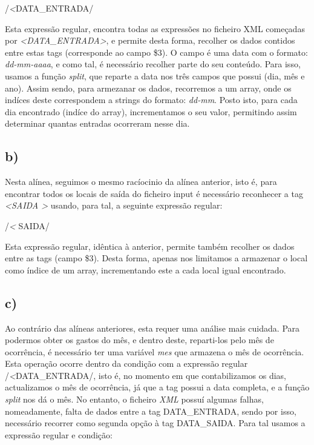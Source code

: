 \documentclass[12pt,a4paper]{report}
\begin{document}
\begin{center}
\vspace{0.3cm}
/\^\emph{\textless}DATA\_ENTRADA/ \par
\vspace{0.3cm}
\end{center}


\noindent Esta expressão regular, encontra todas as expressões no ficheiro XML começadas por \emph{\textless DATA\_ENTRADA\textgreater}, e permite desta forma, recolher os dados contidos entre estas tags (corresponde ao campo \$3). O campo é uma data com o formato: \emph{dd-mm-aaaa}, e como tal, é necessário recolher parte do seu conteúdo. Para isso, usamos a função \emph{split}, que reparte a data nos três campos que possui (dia, mês e ano).
Assim sendo, para armezanar os dados, recorremos a um array, onde os indíces deste correspondem a strings do formato: \emph{dd-mm}. Posto isto, para cada dia encontrado (indíce do array), incrementamos o seu valor, permitindo assim determinar quantas entradas ocorreram nesse dia. 

\subsection{b)}
Nesta alínea, seguimos o mesmo racíocinio da alínea anterior, isto é, para encontrar todos os locais de saída do ficheiro input é necessário reconhecer a tag \emph{\textless SAIDA \textgreater} usando, para tal, a seguinte expressão regular: \par 

\begin{center}
\vspace{0.3cm}
/\^\emph{\textless} SAIDA/ \par
\vspace{0.3cm}
\end{center}


\noindent Esta expressão regular, idêntica à anterior, permite também recolher os dados entre as tags (campo \$3). Desta forma, apenas nos limitamos a armazenar o local como índice de um array, incrementando este a cada local igual encontrado.

\subsection{c)}
Ao contrário das alíneas anteriores, esta requer uma análise mais cuidada. Para podermos obter os gastos do mês, e dentro deste, reparti-los pelo mês de ocorrência, é necessário ter uma variável \emph{mes} que armazena o mês de ocorrência. Esta operação ocorre dentro da condição com a expressão regular /\^\emph{\textless}DATA\_ENTRADA/, isto é, no momento em que contabilizamos os dias, actualizamos o mês de ocorrência, já que a tag possui a data completa, e a função \emph{split} nos dá o mês. No entanto, o ficheiro \emph{XML} possuí algumas falhas, nomeadamente, falta de dados entre a tag DATA\_ENTRADA, sendo por isso, necessário recorrer como segunda opção à tag DATA\_SAIDA. Para tal usamos a expressão regular e condição:
\end{document}
